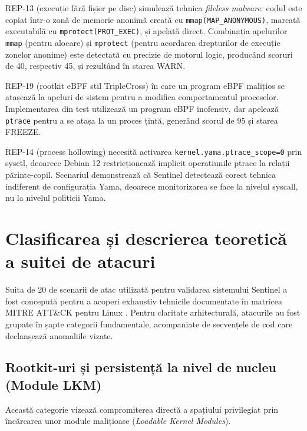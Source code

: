 \par REP-13 (execuție fără fișier pe disc) simulează tehnica \textit{fileless malware}: codul este copiat într-o zonă de memorie anonimă creată cu \texttt{mmap(MAP\_ANONYMOUS)}, marcată executabilă cu \texttt{mprotect(PROT\_EXEC)}, și apelată direct. Combinația apelurilor \texttt{mmap} (pentru alocare) și \texttt{mprotect} (pentru acordarea drepturilor de execuție zonelor anonime) este detectată cu precizie de motorul logic, producând scoruri de 40, respectiv 45, și rezultând în starea WARN.

\par REP-19 (rootkit eBPF stil TripleCross) în care un program eBPF malițios se atașează la apeluri de sistem pentru a modifica comportamentul proceselor. Implementarea din test utilizează un program eBPF inofensiv, dar apelează \texttt{ptrace} pentru a se atașa la un proces țintă, generând scorul de 95 și starea FREEZE.

\par REP-14 (process hollowing) necesită activarea \texttt{kernel.yama.ptrace\_scope=0} prin sysctl, deoarece Debian 12 restricționează implicit operațiunile ptrace la relații părinte-copil. Scenariul demonstrează că Sentinel detectează corect tehnica indiferent de configurația Yama, deoarece monitorizarea se face la nivelul syscall, nu la nivelul politicii Yama.


\section{Clasificarea și descrierea teoretică a suitei de atacuri}
\label{sec:attack_classification}

\par Suita de 20 de scenarii de atac utilizată pentru validarea sistemului Sentinel a fost concepută pentru a acoperi exhaustiv tehnicile documentate în matricea MITRE ATT\&CK pentru Linux \cite{MITRE_ATTCK}. Pentru claritate arhitecturală, atacurile au fost grupate în șapte categorii fundamentale, acompaniate de secvențele de cod care declanșează anomaliile vizate.

\subsection{Rootkit-uri și persistență la nivel de nucleu (Module LKM)}
\label{subsec:attack_lkm}

\par Această categorie vizează compromiterea directă a spațiului privilegiat prin încărcarea unor module malițioase (\textit{Loadable Kernel Modules}).

